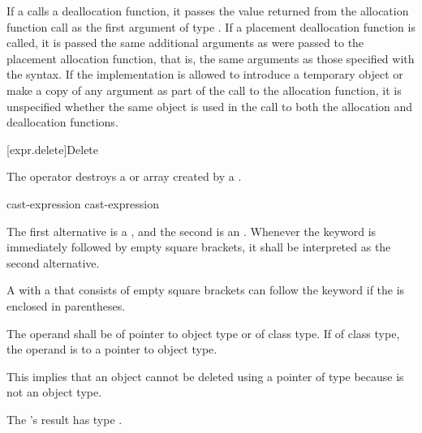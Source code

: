 \pnum
If a  calls a deallocation function, it passes
the value returned from the allocation function call as the first
argument of type . If a placement deallocation function is
called, it is passed the same additional arguments as were passed to the
placement allocation function, that is, the same arguments as those
specified with the  syntax.
If the implementation is allowed
to introduce a temporary object or make a copy of any argument
as part of the call to the allocation function,
it is unspecified whether the same object is used in the call
to both the allocation and deallocation functions.

[expr.delete]{Delete}

\pnum
{}%
The  operator destroys a
 or array created by a
.

\begin{bnf}
\br
    \opt{\terminal{::}}  cast-expression\br
    \opt{\terminal{::}}  \terminal{[} \terminal{]} cast-expression
\end{bnf}

The first alternative is a
, and the
second is an .
Whenever the  keyword is immediately followed by empty square
brackets, it shall be interpreted as the second alternative.
\begin{footnote}
A
 with a 
that consists of empty square brackets can follow the  keyword
if the  is enclosed in parentheses.
\end{footnote}
The operand shall be of pointer to object type or of class type. If of
class type, the operand is 
to a pointer to object
type.
\begin{footnote}
This implies that an object
cannot be deleted using a pointer of type
 because  is not an object type.
\end{footnote}
The 's result has type
.

